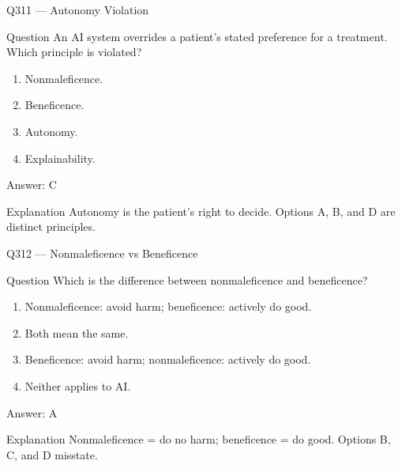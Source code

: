 \documentclass[aspectratio=169,8pt]{beamer}
\begin{document}
\begin{frame}{Q311 --- Autonomy Violation}
	\begin{block}{Question}
		An AI system overrides a patient's stated preference for a treatment. Which principle is violated?
		\begin{enumerate}
			\item Nonmaleficence.
			\item Beneficence.
			\item Autonomy.
			\item Explainability.
	\end{enumerate}  \end{block}
	\begin{exampleblock}{Answer: C}\end{exampleblock}
	\begin{block}{Explanation}
		Autonomy is the patient's right to decide. Options A, B, and D are distinct principles.
	\end{block}
\end{frame}

\begin{frame}{Q312 --- Nonmaleficence vs Beneficence}
	\begin{block}{Question}
		Which is the difference between nonmaleficence and beneficence?
		\begin{enumerate}
			\item Nonmaleficence: avoid harm; beneficence: actively do good.
			\item Both mean the same.
			\item Beneficence: avoid harm; nonmaleficence: actively do good.
			\item Neither applies to AI.
	\end{enumerate}  \end{block}
	\begin{exampleblock}{Answer: A}\end{exampleblock}
	\begin{block}{Explanation}
		Nonmaleficence = do no harm; beneficence = do good. Options B, C, and D misstate.
	\end{block}
\end{frame}
\end{document}
